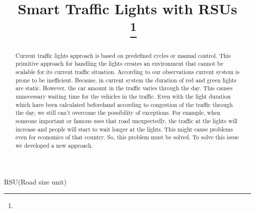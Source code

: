 \documentclass[conference]{IEEEtran}
\begin{document}
\title{Smart Traffic Lights with RSUs\\
	{\footnotesize \textsuperscript \  }
	\thanks{}
}

\author{
	\and
	\and
	
}

\maketitle

\begin{abstract}
	Current traffic lights approach is based on predefined cycles or manual control. This  primitive approach for handling the lights creates an environment that cannot be scalable  for its current traffic situation. According to our observations current system is prone to be inefficient. Because, in current system the duration of red and green lights are static. However, the car amount in the traffic varies through the day. This causes unnecessary waiting time for the vehicles in the traffic. Even with the light duration which have been calculated beforehand according to congestion of the traffic through the day, we still can't overcome the possibility of exceptions. For example, when someone important or famous uses that road unexpectedly, the traffic at the lights will increase and people will start to wait longer at the lights. This might cause problems even for economics of that country.\cite{a1} So, this problem must be solved. To solve this issue we developed a new approach.
\end{abstract}

\begin{IEEEkeywords}
	RSU(Road size unit)
\end{IEEEkeywords}
\end{document}
